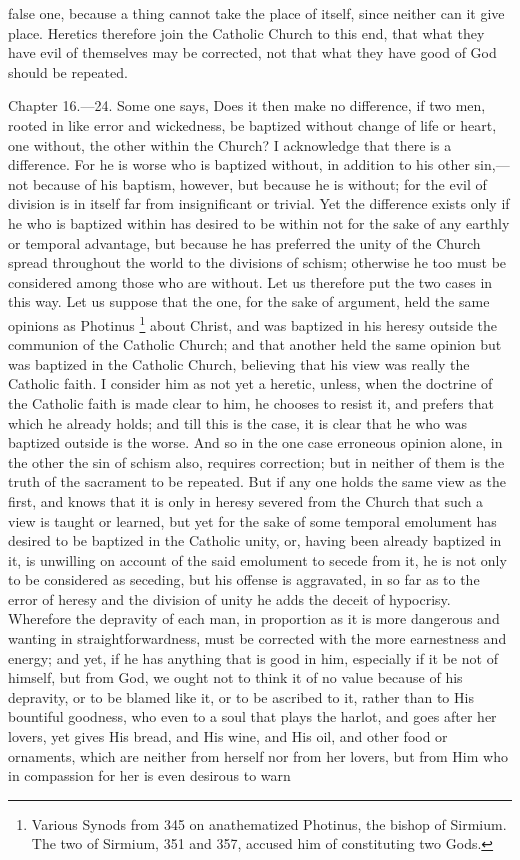 false one, because a thing cannot take the place of itself, since neither can it give place. Heretics therefore join the Catholic Church to this end, that what they have evil of themselves may be corrected, not that what they have good of God should be repeated.


Chapter 16.—24. Some one says, Does it then make no difference, if two men, rooted in like error and wickedness, be baptized without change of life or heart, one without, the other within the Church? I acknowledge that there is a difference. For he is worse who is baptized without, in addition to his other sin,—not because of his baptism, however, but because he is without; for the evil of division is in itself far from insignificant or trivial. Yet the difference exists only if he who is baptized within has desired to be within not for the sake of any earthly or temporal advantage, but because he has preferred the unity of the Church spread throughout the world to the divisions of schism; otherwise he too must be considered among those who are without. Let us therefore put the two cases in this way. Let us suppose that the one, for the sake of argument, held the same opinions as Photinus \footnote{\par  Various Synods from 345 on anathematized Photinus, the bishop of Sirmium. The two of Sirmium, 351 and 357, accused him of constituting two Gods.} about Christ, and was baptized in his heresy outside the communion of the Catholic Church; and that another held the same opinion but was baptized in the Catholic Church, believing that his view was really the Catholic faith. I consider him as not yet a heretic, unless, when the doctrine of the Catholic faith is made clear to him, he chooses to resist it, and prefers that which he already holds; and till this is the case, it is clear that he who was baptized outside is the worse. And so in the one case erroneous opinion alone, in the other the sin of schism also, requires correction; but in neither of them is the truth of the sacrament to be repeated. But if any one holds the same view as the first, and knows that it is only in heresy severed from the Church that such a view is taught or learned, but yet for the sake of some temporal emolument has desired to be baptized in the Catholic unity, or, having been already baptized in it, is unwilling on account of the said emolument to secede from it, he is not only to be considered as seceding, but his offense is aggravated, in so far as to the error of heresy and the division of unity he adds the deceit of hypocrisy. Wherefore the depravity of each man, in proportion as it is more dangerous and wanting in straightforwardness, must be corrected with the more earnestness and energy; and yet, if he has anything that is good in him, especially if it be not of himself, but from God, we ought not to think it of no value because of his depravity, or to be blamed like it, or to be ascribed to it, rather than to His bountiful goodness, who even to a soul that plays the harlot, and goes after her lovers, yet gives His bread, and His wine, and His oil, and other food or ornaments, which are neither from herself nor from her lovers, but from Him who in compassion for her is even desirous to warn 